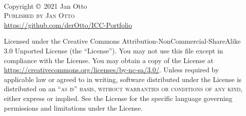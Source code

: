 \documentclass[11pt,fleqn]{book} %
\begin{document}

\begingroup
\thispagestyle{empty} %
\vfill
\endgroup


\newpage
~\vfill
\thispagestyle{empty}

\noindent Copyright \copyright\ 2021 Jan Otto\\ %

\noindent \textsc{Published by Jan Otto}\\ %

\noindent \href{https://github.com/derOtto/ICC-Portfolio}{https://github.com/derOtto/ICC-Portfolio}\\ %

\noindent \href{https://creativecommons.org/licenses/by-nc-sa/3.0/}{\ccbyncsa}

\noindent Licensed under the Creative Commons Attribution-NonCommercial-ShareAlike 3.0 Unported License (the ``License''). You may not use this file except in compliance with the License. You may obtain a copy of the License at \url{https://creativecommons.org/licenses/by-nc-sa/3.0/}. Unless required by applicable law or agreed to in writing, software distributed under the License is distributed on an \textsc{``as is'' basis, without warranties or conditions of any kind}, either express or implied. See the License for the specific language governing permissions and limitations under the License.\\ %
\end{document}
